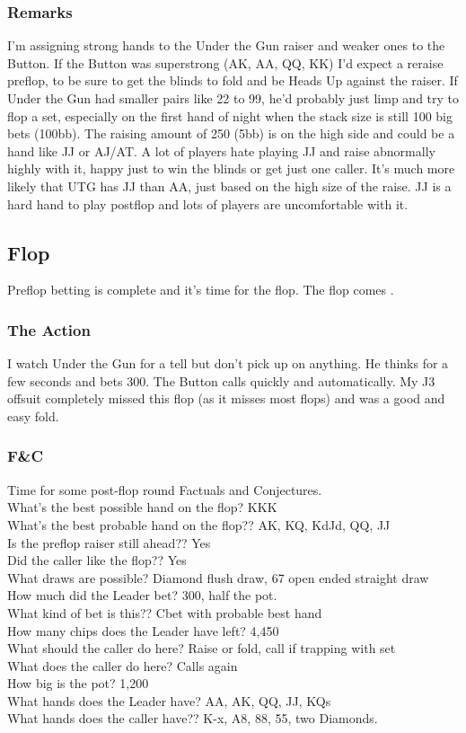 \subsubsection*{Remarks}
I'm assigning strong hands to the Under the Gun raiser and
weaker ones to the Button.
If the Button was superstrong (AK, AA, QQ, KK) I'd expect a reraise
preflop, to be sure to get the blinds to fold and be Heads Up
against the raiser. If Under the Gun had smaller pairs like 22 to 99,
he'd probably just limp and try to flop a set, especially on
the first hand of night when the stack size is still 100 big bets (100bb).
The raising amount of 250 (5bb) is on the high side and could be
a hand like JJ or AJ/AT. A lot of players hate playing JJ and raise
abnormally highly with it, happy just to win the blinds or get
just one caller. It's much more likely that UTG has JJ than AA, just
based on the high size of the raise. JJ is a hard hand to play
postflop and lots of players are uncomfortable with it.

\subsection*{Flop}

Preflop betting is complete and it's time for the flop.
The flop comes \Kc\eigd\fived.

\subsubsection*{The Action}
I watch Under the Gun for a tell but don't pick
up on anything. He thinks for a few seconds and bets 300. The Button calls
quickly and automatically. My J3 offsuit completely missed this
flop (as it misses most flops) and was a good and easy fold.

\subsubsection*{F\&C}
Time for some post-flop round Factuals and Conjectures. \\
What's the best possible hand on the flop? KKK \\
What's the best probable hand on the flop?? AK, KQ, KdJd, QQ, JJ \\
Is the preflop raiser still ahead?? Yes \\
Did the caller like the flop?? Yes \\
What draws are possible? Diamond flush draw, 67 open ended straight draw \\
How much did the Leader bet? 300, half the pot. \\
What kind of bet is this?? Cbet with probable best hand \\
How many chips does the Leader have left? 4,450 \\
What should the caller do here? Raise or fold, call if trapping with set \\
What does the caller do here? Calls again \\
How big is the pot? 1,200 \\
What hands does the Leader have? AA, AK, QQ, JJ, KQs \\
What hands does the caller have?? K-x, A8, 88, 55, two Diamonds.

